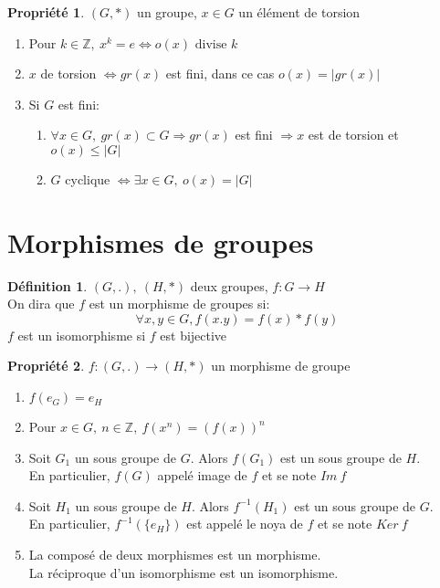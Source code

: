 \documentclass[fleqn]{article}
\theoremstyle{definition} \newtheorem*{defi}{D\'efinition}
\theoremstyle{definition} \newtheorem*{theo}{Th\'eor\`eme}
\theoremstyle{definition} \newtheorem*{coro}{Corollaire}
\theoremstyle{remark} \newtheorem*{rqs}{Remarques}
\theoremstyle{definition} \newtheorem*{prop}{Propri\'et\'e}
\begin{document}
\begin{prop} $(G,*)$ un groupe, $x \in G$ un \'el\'ement de torsion
	\begin{enumerate}
		\item Pour $k \in \mathbb{Z},\ x^k = e \Leftrightarrow o(x) \text{ divise } k$
		\item $x$ de torsion $\Leftrightarrow gr(x)$ est fini, dans ce cas $o(x) = |gr(x)|$
		\item Si $G$ est fini:
			\begin{enumerate}
				\item $\forall x \in G,\ gr(x) \subset G \Rightarrow gr(x)$ est fini $\Rightarrow x$ est de torsion et $o(x) \leq |G|$
				\item $G$ cyclique $\Leftrightarrow \exists x \in G,\ o(x) = |G|$
			\end{enumerate}
	\end{enumerate}
\end{prop}

\section{Morphismes de groupes}
\begin{defi}
$(G,.),\ (H, *)$ deux groupes, $f: G \rightarrow H$ \\
On dira que $f$ est un morphisme de groupes si:
\[\forall x,y \in G, f(x.y) = f(x) * f(y)\]
$f$ est un isomorphisme si $f$ est bijective
\end{defi}

\begin{prop} $f: (G,.) \rightarrow (H,*)$ un morphisme de groupe
	\begin{enumerate}
		\item $f(e_G) = e_H$
		\item Pour $x \in G,\ n \in \mathbb{Z},\ f(x^n) = (f(x))^n$
		\item Soit $G_1$ un sous groupe de $G$. Alors $f(G_1)$ est un sous groupe de $H$.\\ En particulier, $f(G)$ appel\'e image de $f$
			et se note $Im\ f$
		\item Soit $H_1$ un sous groupe de $H$. Alors $f^{-1}(H_1)$ est un sous groupe de $G$. \\ En particulier, $f^{-1}(\{e_H\})$ est
			appel\'e le noya de $f$ et se note $Ker\ f$
		\item La compos\'e de deux morphismes est un morphisme.\\
			La r\'eciproque d'un isomorphisme est un isomorphisme.
	\end{enumerate}
\end{prop}
\end{document}
